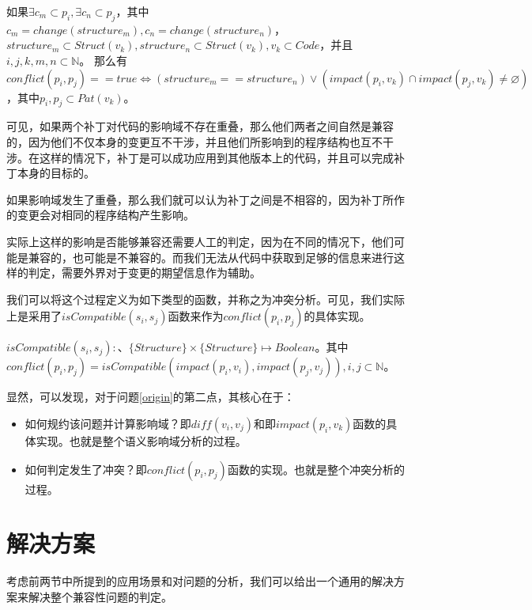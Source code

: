 \begin{definition}
	\label {problem}
	如果$\exists c_m \subset p_i, \exists c_n \subset p_j$，其中$c_m = change(structure_m),c_n = change(structure_n)$， $structure_m \subset Struct(v_k), structure_n \subset Struct(v_k), v_k \subset Code$，并且$i,j,k,m,n \subset \mathbb{N}$。
	那么有$conflict(p_i,p_j) == true \iff (structure_m == structure_n) \lor (impact(p_i,v_k) \cap impact(p_j,v_k) \neq \varnothing)$，其中$p_i,p_j \subset Pat(v_k)$。
\end{definition}

可见，如果两个补丁对代码的影响域不存在重叠，那么他们两者之间自然是兼容的，因为他们不仅本身的变更互不干涉，并且他们所影响到的程序结构也互不干涉。在这样的情况下，补丁是可以成功应用到其他版本上的代码，并且可以完成补丁本身的目标的。

如果影响域发生了重叠，那么我们就可以认为补丁之间是不相容的，因为补丁所作的变更会对相同的程序结构产生影响。

实际上这样的影响是否能够兼容还需要人工的判定，因为在不同的情况下，他们可能是兼容的，也可能是不兼容的。而我们无法从代码中获取到足够的信息来进行这样的判定，需要外界对于变更的期望信息作为辅助。

我们可以将这个过程定义为如下类型的函数，并称之为冲突分析。可见，我们实际上是采用了$isCompatible(s_i,s_j)$函数来作为$conflict(p_i,p_j)$的具体实现。

\begin{definition}
	$isCompatible(s_i,s_j) : 、\{Structure\} \times \{Structure\} \mapsto Boolean$。其中$conflict(p_i,p_j) = isCompatible(impact(p_i,v_i),impact(p_j,v_j)),i,j \subset \mathbb{N}$。
\end{definition}

显然，可以发现，对于问题\ref {origin}的第二点，其核心在于：
\begin{itemize}
	\item 如何规约该问题并计算影响域？即$diff(v_i,v_j)$和即$impact(p_i,v_k)$函数的具体实现。也就是整个语义影响域分析的过程。
	\item 如何判定发生了冲突？即$conflict(p_i,p_j)$函数的实现。也就是整个冲突分析的过程。
\end{itemize}


\section{解决方案}
\label {problem_solve}

考虑前两节中所提到的应用场景和对问题的分析，我们可以给出一个通用的解决方案来解决整个兼容性问题的判定。

